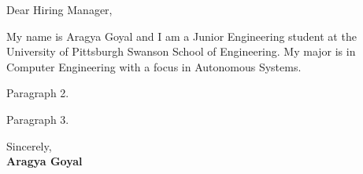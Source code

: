 \documentclass[a4paper,11pt]{letter}
\begin{document}

\normalsize Dear Hiring Manager,

\small \noindent
My name is Aragya Goyal and I am a Junior Engineering student at the University of Pittsburgh Swanson School of Engineering. My major is in Computer Engineering with a focus in Autonomous Systems.

\vspace{1pt}
Paragraph 2.

\vspace{1pt}
Paragraph 3.

\bigskip
\noindent
Sincerely,\\
\textbf{Aragya Goyal}
\end{document}
